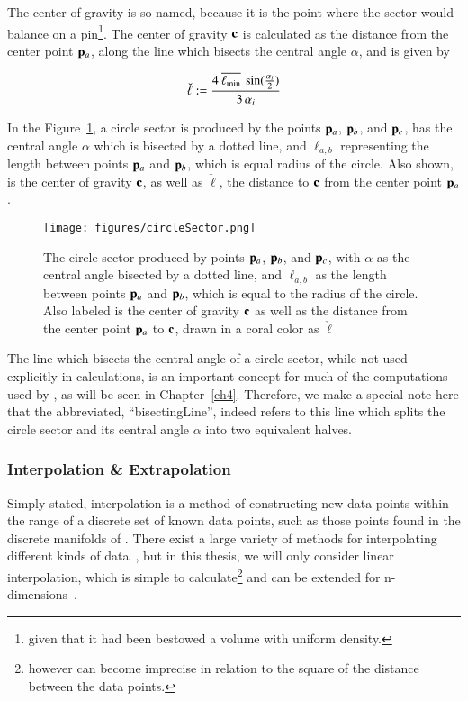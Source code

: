 The center of gravity is so named, because it is the point where the sector would balance on a pin\footnote{given that it had been bestowed a volume with uniform density.}. The center of gravity $\mathbf{c}$ is calculated as the distance from the center point $\mathbf{p}_a$, along the line which bisects the central angle $\alpha$, and is given by

\begin{equation}
	\check{\ell} := \frac{4\:\overline{\ell_\text{min}}\:\sin(\frac{\alpha_i}{2})}{3\,\alpha_i}
	\label{eq:ch2distToCoG}
\end{equation}%
%
%

In the Figure~\ref{fig:circleSector}, a circle sector is produced by the points $\mathbf{p}_a$, $\mathbf{p}_b$, and $\mathbf{p}_c$, has the central angle $\alpha$ which is bisected by a dotted line, and $\ell_{a,b}$ representing the length between points $\mathbf{p}_a$ and $\mathbf{p}_b$, which is equal radius of the circle. Also shown, is the center of gravity $\mathbf{c}$, as well as $\check{\ell}$, the distance to $\mathbf{c}$ from the center point $\mathbf{p}_a$.

\begin{figure}[ht]
\ffigbox
	{\texttt{[image: figures/circleSector.png]}}
	{\caption[A Circle Sector in Detail]{The circle sector produced by points $\mathbf{p}_a$, $\mathbf{p}_b$, and $\mathbf{p}_c$, with $\alpha$ as the central angle bisected by a dotted line, and $\ell_{a,b}$ as the length between points $\mathbf{p}_a$ and $\mathbf{p}_b$, which is equal to the radius of the circle. Also labeled is the center of gravity $\mathbf{c}$ as well as the distance from the center point $\mathbf{p}_a$ to $\mathbf{c}$, drawn in a coral color as $\check{\ell}$}\label{fig:circleSector}}
\end{figure}

The line which bisects the central angle of a circle sector, while not used explicitly in calculations, is an important concept for much of the computations used by , as will be seen in Chapter~\ref{ch4}. Therefore, we make a special note here that the abbreviated, ``\gls{bisectingLine}'', indeed refers to this line which splits the circle sector and its central angle $\alpha$ into two equivalent halves.

%
%
\subsubsection{Interpolation \& Extrapolation}
\label{ch2sETBssGsssIE}
Simply stated, interpolation is a method of constructing new data points within the range of a discrete set of known data points, such as those points found in the discrete manifolds of \tdd{}. There exist a large variety of methods for interpolating different kinds of data~\cite{Weisstein19a}, but in this thesis, we will only consider linear interpolation, which is simple to calculate\footnote{however can become imprecise in relation to the square of the distance between the data points.}
and can be extended for n-dimensions~\cite{Weisstein19a}.

